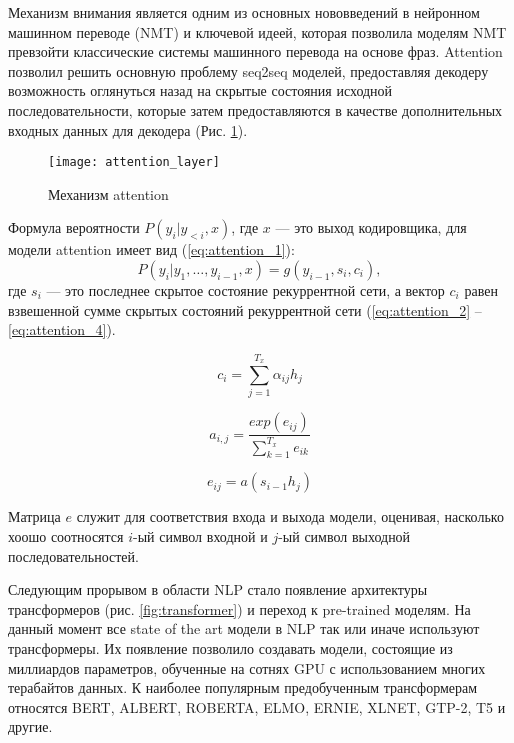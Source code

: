 Механизм внимания является одним из основных нововведений в нейронном машинном переводе (NMT) и ключевой идеей, которая позволила моделям NMT превзойти классические системы машинного перевода на основе фраз. Attention позволил решить основную проблему seq2seq моделей, предоставляя декодеру возможность оглянуться назад на скрытые состояния исходной последовательности, которые затем предоставляются в качестве дополнительных входных данных для декодера (Рис. \ref{fig:attention}).

\begin{figure}[ht]
	\centering
	\texttt{[image: attention\_layer]}  
	\caption{ Механизм attention }
	\label{fig:attention}
\end{figure}

Формула вероятности $P(y_i|y_{<i}, x)$, где $x$ --- это выход кодировщика, для модели attention имеет вид (\ref{eq:attention_1}):
\begin{equation}
	P(y_i|y_1,\dots,y_{i-1}, x) = g(y_{i-1}, s_i, c_i),
	\label{eq:attention_1}
\end{equation} где $s_i$ --- это последнее скрытое состояние рекуррентной сети, а вектор $c_i$ равен взвешенной сумме скрытых состояний рекуррентной сети (\ref{eq:attention_2} -- \ref{eq:attention_4}).

\begin{equation}
	c_i = \sum_{j=1}^{T_x}{\alpha_{ij}h_j}
	\label{eq:attention_2}
\end{equation}

\begin{equation}
	a_{i,j} = \frac{exp(e_{ij})}{\sum_{k=1}^{T_x}{e_{ik}}}
	\label{eq:attention_3}
\end{equation}

\begin{equation}
	e_{ij} = a(s_{i-1}h_j)
	\label{eq:attention_4}
\end{equation}

Матрица $e$ служит для соответствия входа и выхода модели, оценивая, насколько хоошо соотносятся $i$-ый символ входной и $j$-ый символ выходной последовательностей.~\cite{attention}

Следующим прорывом в области NLP стало появление архитектуры трансформеров (рис. \ref{fig:transformer}) и переход к pre-trained моделям. На данный момент все state of the art модели в NLP так или иначе используют трансформеры. Их появление позволило создавать модели, состоящие из миллиардов параметров, обученные на сотнях GPU с использованием многих терабайтов данных. К наиболее популярным предобученным трансформерам относятся BERT, ALBERT, ROBERTA, ELMO, ERNIE, XLNET, GTP-2, T5 и другие.

